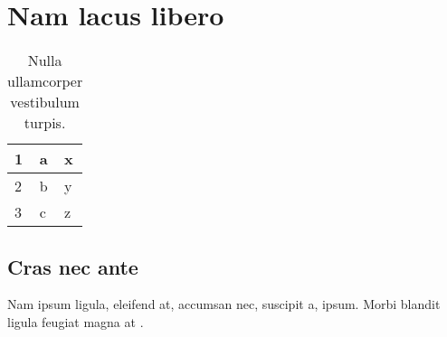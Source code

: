 \documentclass[12pt]{report}
\begin{document}
\clearpage
\linenumbers %
\modulolinenumbers[3] %
\chapter{Nam lacus libero}
\lipsum[2-4] \lipsum[1]
\begin{table}[]
\centering
\caption{Nulla ullamcorper vestibulum turpis.}
\label{my-label}
\begin{tabular}{lll}
1 & a & x \\ \hline
2 & b & y \\
3 & c & z
\end{tabular}
\end{table}
\section{Cras nec ante}
\lipsum[2-3]
Nam ipsum ligula, eleifend at, accumsan nec, suscipit a, ipsum. Morbi blandit ligula feugiat magna \cite{Rodrigues2016} at \cite{kopka2004guide}.




\end{document}

